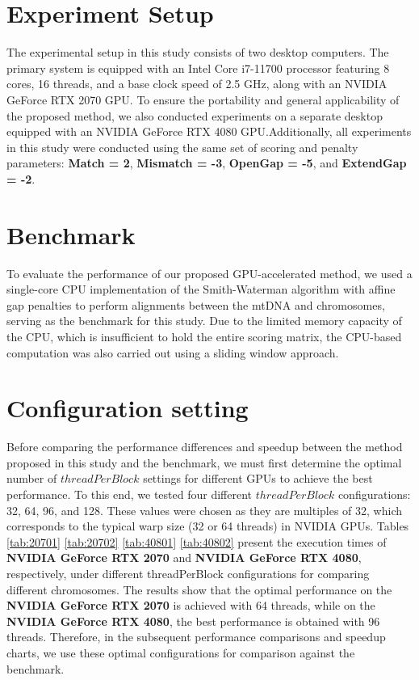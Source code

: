 \documentclass[PhD]{PHlab-thesis}
\begin{document}
\section{Experiment Setup}
The experimental setup in this study consists of two desktop computers. The primary system is equipped with an Intel Core i7-11700 processor featuring 8 cores, 16 threads, and a base clock speed of 2.5 GHz, along with an NVIDIA GeForce RTX 2070 GPU. To ensure the portability and general applicability of the proposed method, we also conducted experiments on a separate desktop equipped with an NVIDIA GeForce RTX 4080 GPU.Additionally, all experiments in this study were conducted using the same set of scoring and penalty parameters: \textbf{Match = 2}, \textbf{Mismatch = -3}, \textbf{OpenGap = -5}, and \textbf{ExtendGap = -2}.

\section{Benchmark}
To evaluate the performance of our proposed GPU-accelerated method, we used a single-core CPU implementation of the Smith-Waterman algorithm with affine gap penalties to perform alignments between the mtDNA and chromosomes, serving as the benchmark for this study. Due to the limited memory capacity of the CPU, which is insufficient to hold the entire scoring matrix, the CPU-based computation was also carried out using a sliding window approach.

\section{Configuration setting}
Before comparing the performance differences and speedup between the method proposed in this study and the benchmark, we must first determine the optimal number of $threadPerBlock$ settings for different GPUs to achieve the best performance. To this end, we tested four different $threadPerBlock$ configurations: 32, 64, 96, and 128. These values were chosen as they are multiples of 32, which corresponds to the typical warp size (32 or 64 threads) in NVIDIA GPUs.
Tables \ref{tab:20701} \ref{tab:20702} \ref{tab:40801} \ref{tab:40802} present the execution times of \textbf{NVIDIA GeForce RTX 2070} and \textbf{NVIDIA GeForce RTX 4080}, respectively, under different threadPerBlock configurations for comparing different chromosomes. The results show that the optimal performance on the \textbf{NVIDIA GeForce RTX 2070} is achieved with 64 threads, while on the \textbf{NVIDIA GeForce RTX 4080}, the best performance is obtained with 96 threads. Therefore, in the subsequent performance comparisons and speedup charts, we use these optimal configurations for comparison against the benchmark.
\end{document}
